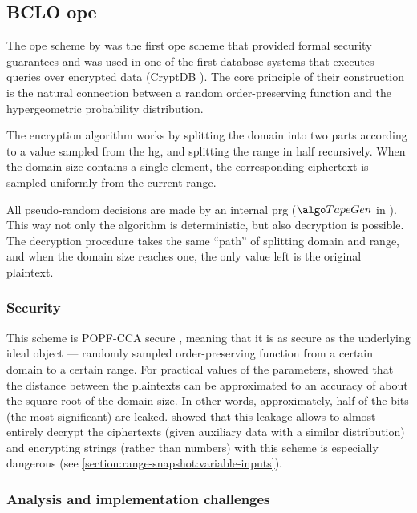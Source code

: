\subsection{BCLO \texorpdfstring{\acrshort{ope}}{OPE}}

	The \acrshort{ope} scheme by \textcite{bclo-ope} was the first \acrshort{ope} scheme that provided formal security guarantees and was used in one of the first database systems that executes queries over encrypted data (CryptDB \cite{crypt-db}).
 	The core principle of their construction is the natural connection between a random order-preserving function and the hypergeometric probability distribution.

	The encryption algorithm works by splitting the domain into two parts according to a value sampled from the \acrfull{hg}, and splitting the range in half recursively.
	When the domain size contains a single element, the corresponding ciphertext is sampled uniformly from the current range.

	All pseudo-random decisions are made by an internal \acrshort{prg} ($\tapegen$ in \cite{bclo-ope}).
	This way not only the algorithm is deterministic, but also decryption is possible.
	The decryption procedure takes the same ``path'' of splitting domain and range, and when the domain size reaches one, the only value left is the original plaintext.

	\subsubsection{Security}
		This scheme is POPF-CCA secure \cite{bclo-ope}, meaning that it is as secure as the underlying ideal object --- randomly sampled order-preserving function from a certain domain to a certain range.
		For practical values of the parameters, \textcite{ope-leakage} showed that the distance between the plaintexts can be approximated to an accuracy of about the square root of the domain size.
		In other words, approximately, half of the bits (the most significant) are leaked.
		\textcite{leakage-abuse-grubs-2017} showed that this leakage allows to almost entirely decrypt the ciphertexts (given auxiliary data with a similar distribution) and encrypting strings (rather than numbers) with this scheme is especially dangerous (see \cref{section:range-snapshot:variable-inputs}).

	\subsubsection{Analysis and implementation challenges}

